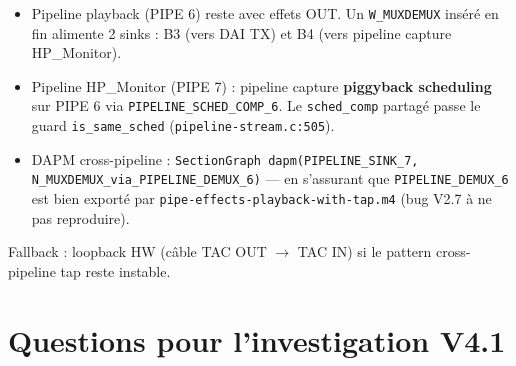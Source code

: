 \documentclass[11pt,a4paper]{article}
\begin{document}
\begin{itemize}[leftmargin=*, itemsep=1pt]
  \item Pipeline playback (PIPE 6) reste avec effets OUT. Un \texttt{W\_MUXDEMUX} inséré en fin alimente 2 sinks : B3 (vers DAI TX) et B4 (vers pipeline capture HP\_Monitor).
  \item Pipeline HP\_Monitor (PIPE 7) : pipeline capture \textbf{piggyback scheduling} sur PIPE 6 via \texttt{PIPELINE\_SCHED\_COMP\_6}. Le \texttt{sched\_comp} partagé passe le guard \texttt{is\_same\_sched} (\texttt{pipeline-stream.c:505}).
  \item DAPM cross-pipeline : \texttt{SectionGraph dapm(PIPELINE\_SINK\_7, N\_MUXDEMUX\_via\_PIPELINE\_DEMUX\_6)} --- en s'assurant que \texttt{PIPELINE\_DEMUX\_6} est bien exporté par \texttt{pipe-effects-playback-with-tap.m4} (bug V2.7 à ne pas reproduire).
\end{itemize}

Fallback : loopback HW (câble TAC OUT $\to$ TAC IN) si le pattern cross-pipeline tap reste instable.

\section{Questions pour l'investigation V4.1}
\end{document}
